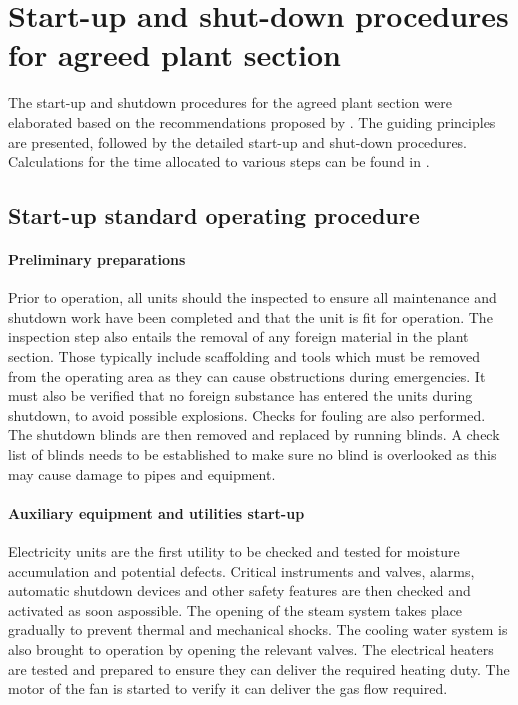 \section{Start-up and shut-down procedures for agreed plant section}
The start-up and shutdown procedures for the agreed plant section were elaborated based on the recommendations proposed by \textcite{}. The guiding principles are presented, followed by the detailed start-up and shut-down procedures. Calculations for the time allocated to various steps can be found in .

\subsection{Start-up standard operating procedure}

\paragraph{Preliminary preparations}
Prior to operation, all units should the inspected to ensure all maintenance and shutdown work have been completed and that the unit is fit for operation. The inspection step also entails the removal of any foreign material in the plant section. Those typically include scaffolding and tools which must be removed from the operating area as they can cause obstructions during emergencies. It must also be verified that no foreign substance has entered the units during shutdown, to avoid possible explosions. Checks for fouling are also performed. The shutdown blinds are then removed and replaced by running blinds. A check list of blinds needs to be established to make sure no blind is overlooked as this may cause damage to pipes and equipment.



\paragraph{Auxiliary equipment and utilities start-up}

Electricity units are the first utility to be checked and tested for moisture accumulation and potential defects. Critical instruments and valves, alarms, automatic shutdown devices and other safety features are then checked and activated as soon aspossible.
The opening of the steam system takes place gradually to prevent thermal and mechanical shocks. The cooling water system is also brought to operation by opening the relevant valves. The electrical heaters are tested and prepared to ensure they can deliver the required heating duty. The motor of the fan is started to verify it can deliver the gas flow required. 

